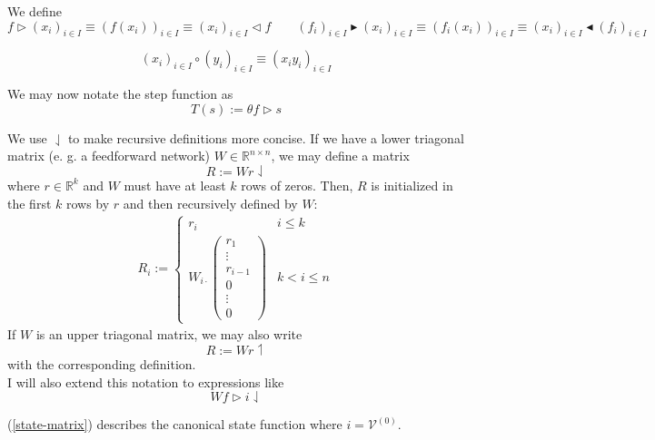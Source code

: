 \documentclass[a4paper,11pt]{article}
\begin{document}
\begin{Not}
We define
\begin{equation}
f\vartriangleright (x_i)_{i\in I}\equiv \left(f(x_i)\right)_{i\in I}\equiv (x_i)_{i\in I}\vartriangleleft f\qquad (f_i)_{i\in I}\blacktriangleright (x_i)_{i\in I}\equiv\left(f_i(x_i)\right)_{i\in I}\equiv (x_i)_{i\in I}\blacktriangleleft (f_i)_{i\in I}
\end{equation}
\end{Not}
\begin{Not}
\begin{equation}
(x_i)_{i\in I}\circ(y_i)_{i\in I}\equiv (x_iy_i)_{i\in I}
\end{equation}
\end{Not}
\begin{Abs}
We may now notate the step function as
\begin{equation}
T(s):=\theta f\vartriangleright s
\end{equation}
\end{Abs}
\begin{Not}
We use $\downharpoonleft$ to make recursive definitions more concise. If we have a lower triagonal matrix (e. g. a feedforward network) $W\in\mathbb{R}^{n\times n}$, we may define a matrix
\begin{equation}
R:=Wr\downharpoonleft
\end{equation}
where $r\in\mathbb{R}^k$ and $W$ must have at least $k$ rows of zeros. Then, $R$ is initialized in the first $k$ rows by $r$ and then recursively defined by $W$:
\begin{align}
R_i:=\begin{cases}
r_i&i\le k\\
W_{i\cdot}\left(\begin{smallmatrix}
r_1\\
\vdots\\
r_{i-1}\\
0\\
\vdots\\
0
\end{smallmatrix}\right)&k<i\le n
\end{cases}
\end{align}
If $W$ is an upper triagonal matrix, we may also write
\begin{equation}
R:=Wr\upharpoonleft
\end{equation}
with the corresponding definition.\\
I will also extend this notation to expressions like
\begin{equation}\label{state-matrix}
Wf\vartriangleright i\downharpoonleft
\end{equation}
\end{Not}
\begin{Abs}
(\ref{state-matrix}) describes the canonical state function where $i=\mathcal{V}^{(0)}$.
\end{Abs}
\end{document}
